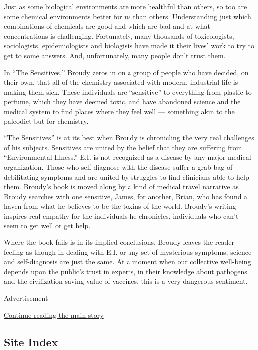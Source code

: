 Just as some biological environments are more healthful than others, so
too are some chemical environments better for us than others.
Understanding just which combinations of chemicals are good and which
are bad and at what concentrations is challenging. Fortunately, many
thousands of toxicologists, sociologists, epidemiologists and biologists
have made it their lives' work to try to get to some answers. And,
unfortunately, many people don't trust them.

In ``The Sensitives,'' Broudy zeros in on a group of people who have
decided, on their own, that all of the chemistry associated with modern,
industrial life is making them sick. These individuals are ``sensitive''
to everything from plastic to perfume, which they have deemed toxic, and
have abandoned science and the medical system to find places where they
feel well --- something akin to the paleodiet but for chemistry.

``The Sensitives'' is at its best when Broudy is chronicling the very
real challenges of his subjects. Sensitives are united by the belief
that they are suffering from ``Environmental Illness.'' E.I. is not
recognized as a disease by any major medical organization. Those who
self-diagnose with the disease suffer a grab bag of debilitating
symptoms and are united by struggles to find clinicians able to help
them. Broudy's book is moved along by a kind of medical travel narrative
as Broudy searches with one sensitive, James, for another, Brian, who
has found a haven from what he believes to be the toxins of the world.
Broudy's writing inspires real empathy for the individuals he
chronicles, individuals who can't seem to get well or get help.

Where the book fails is in its implied conclusions. Broudy leaves the
reader feeling as though in dealing with E.I. or any set of mysterious
symptoms, science and self-diagnosis are just the same. At a moment when
our collective well-being depends upon the public's trust in experts, in
their knowledge about pathogens and the civilization-saving value of
vaccines, this is a very dangerous sentiment.

Advertisement

\protect\hyperlink{after-bottom}{Continue reading the main story}

\hypertarget{site-index}{%
\subsection{Site Index}\label{site-index}}


